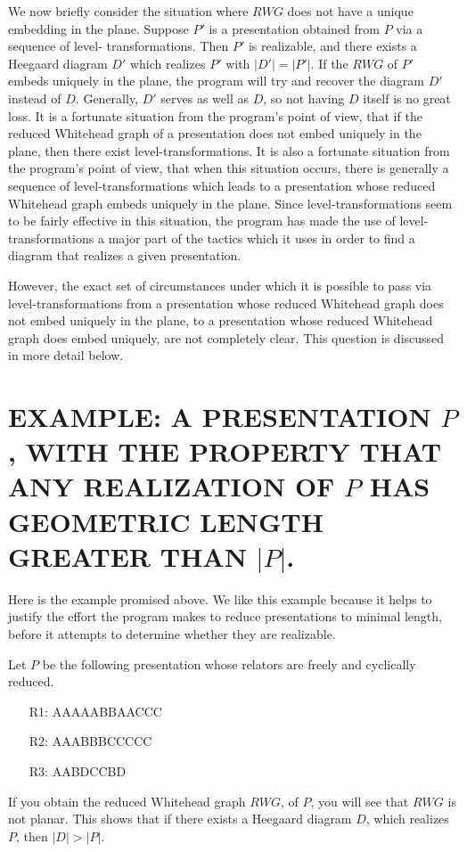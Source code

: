 \documentclass[12pt]{amsart}
\begin{document}
                We now briefly consider the situation where $RWG$ does not have a unique embedding
        in the plane. Suppose $P'$ is a presentation obtained from $P$ via a sequence of level-
        transformations. Then $P'$ is realizable, and there exists a Heegaard diagram $D'$ which
        realizes $P'$ with $|D'| = |P'|$. If the $RWG$ of $P'$ embeds uniquely in the plane, the
        program will try and recover the diagram $D'$ instead of $D$. Generally, $D'$ serves as well
        as $D$, so not having $D$ itself is no great loss. It is a fortunate situation from the
        program's point of view, that if the reduced Whitehead graph of a presentation does not
        embed uniquely in the plane, then there exist level-transformations. It is also a
        fortunate situation from the program's point of view, that when this situation occurs,
        there is generally a sequence of level-transformations which leads to a presentation
        whose reduced Whitehead graph embeds uniquely in the plane. Since level-transformations
        seem to be fairly effective in this situation, the program has made the use of level-
        transformations a major part of the tactics which it uses in order to find a diagram
        that realizes a given presentation.

                However, the exact set of circumstances under which it is possible to pass via
        level-transformations from a presentation whose reduced Whitehead graph does not embed
        uniquely in the plane, to a presentation whose reduced Whitehead graph does embed
        uniquely, are not completely clear. This question is discussed in more detail below.    

        
\section{ EXAMPLE: A PRESENTATION $P$, WITH THE PROPERTY THAT ANY REALIZATION OF $P$ HAS GEOMETRIC LENGTH GREATER THAN $|P|$.}

                Here is the example promised above. We like this example because it helps to
        justify the effort the program makes to reduce presentations to minimal length,
        before it attempts to determine whether they are realizable.
        
        Let $P$ be the following presentation whose relators are freely and cyclically reduced.
        \begin{enumerate}
                \item[R1:]           AAAAABBAACCC
                \item[R2:]           AAABBBCCCCC
                \item[R3:]           AABDCCBD
         \end{enumerate}
        If you obtain the reduced Whitehead graph $RWG$, of $P$, you will see that $RWG$ is not
        planar. This shows that if there exists a Heegaard diagram $D$, which realizes $P$, then
        $|D| > |P|$.
\end{document}
